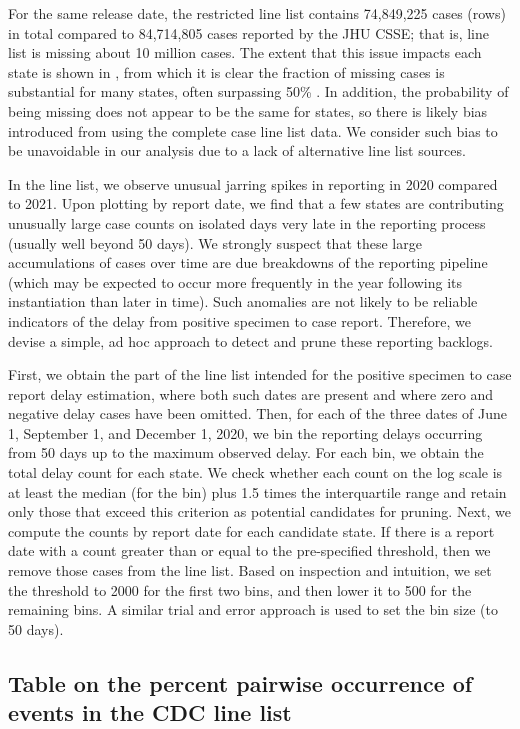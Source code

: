 For the same release date, the restricted line list contains 74,849,225 cases
(rows) in total compared to 84,714,805 cases reported by the JHU CSSE; that is,
line list is missing about 10 million cases. The extent that this issue impacts
each state is shown in , from which it is clear
the fraction of missing cases is substantial for many states, often surpassing
50\% \citep{jahja2022real}. In addition, the probability of being missing does
not appear to be the same for states, so there is likely bias introduced from
using the complete case line list data. We consider such bias to be unavoidable
in our analysis due to a lack of alternative line list sources.

In the line list, we observe unusual jarring spikes in reporting in 2020
compared to 2021. Upon plotting by report date, we find that a few states are
contributing unusually large case counts on isolated days very late in the
reporting process (usually well beyond 50 days). We strongly suspect that these
large accumulations of cases over time are due breakdowns of the reporting
pipeline (which may be expected to occur more frequently in the year following
its instantiation than later in time). Such anomalies are not likely to be
reliable indicators of the delay from positive specimen to case report.
Therefore, we devise a simple, ad hoc approach to detect and prune these
reporting backlogs.

First, we obtain the part of the line list intended for the positive specimen to
case report delay estimation, where both such dates are present and where zero
and negative delay cases have been omitted. Then, for each of the three dates of
June 1, September 1, and December 1, 2020, we bin the reporting delays occurring
from 50 days up to the maximum observed delay. For each bin, we obtain the total
delay count for each state. We check whether each count on the log scale is at
least the median (for the bin) plus 1.5 times the interquartile range and retain
only those that exceed this criterion as potential candidates for pruning. Next,
we compute the counts by report date for each candidate state. If there is a
report date with a count greater than or equal to the pre-specified threshold,
then we remove those cases from the line list. Based on inspection and
intuition, we set the threshold to 2000 for the first two bins, and then lower
it to 500 for the remaining bins. A similar trial and error approach is used to
set the bin size (to 50 days).

\subsection{Table on the percent pairwise occurrence of events in the CDC line list}

